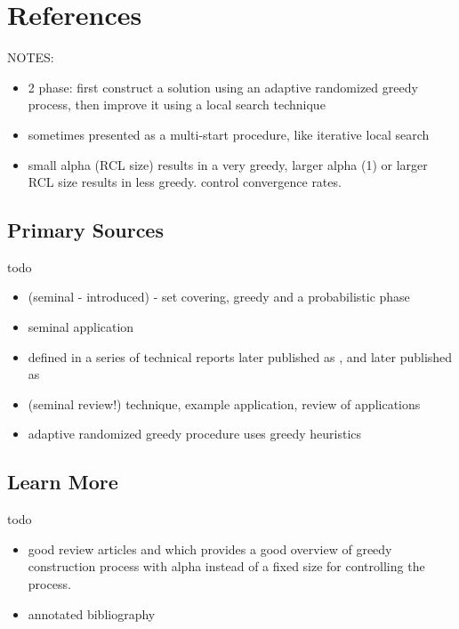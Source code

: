 \documentclass[a4paper, 11pt]{article}
\begin{document}
\section{References}
\label{sec:references}

NOTES: 
\begin{itemize}
	\item 2 phase: first construct a solution using an adaptive randomized greedy process, then improve it using a local search technique
	\item sometimes presented as a multi-start procedure, like iterative local search
	\item small alpha (RCL size) results in a very greedy, larger alpha (1) or larger RCL size results in less greedy. control convergence rates.
\end{itemize}


% 
% 
\subsection{Primary Sources}
todo

\begin{itemize}
	\item (seminal - introduced) \cite{Feo1989} - set covering, greedy and a probabilistic phase
	\item seminal application \cite{Feo1991}
	\item defined in a series of technical reports \cite{Feo1993} later published as \cite{Bard1996}, and \cite{Feo1994} later published as \cite{Feo1996}
	\item (seminal review!) technique, example application, review of applications \cite{Feo1995}
	\item adaptive randomized greedy procedure uses greedy heuristics \cite{Hart1987}
\end{itemize}

% 
% 
\subsection{Learn More}
todo

\begin{itemize}

	\item good review articles \cite{Pitsoulis2002} and \cite{Resende2003} which provides a good overview of greedy construction process with alpha instead of a fixed size for controlling the process.
	\item annotated bibliography \cite{Festa2002}
\end{itemize}
\end{document}
